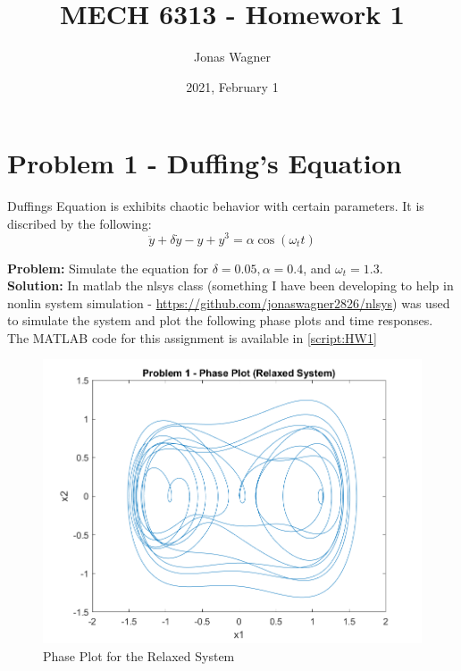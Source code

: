 \documentclass[letter]{article}
\title{MECH 6313 - Homework 1}
\author{Jonas Wagner}
\date{2021, February 1}
\begin{document}
\maketitle


\section{Problem 1 - Duffing's Equation}
Duffings Equation is exhibits chaotic behavior with certain parameters. It is discribed by the following:
\begin{displaymath}
	\ddot{y} + \delta \dot{y} - y + y^3 = \alpha \cos(\omega_t t)
\end{displaymath}

\textbf{Problem:}
Simulate the equation for $\delta = 0.05, \alpha = 0.4$, and $\omega_t = 1.3$.\\

\textbf{Solution:}
In matlab the nlsys class (something I have been developing to help in nonlin system simulation - \href{https://github.com/jonaswagner2826/nlsys}{https://github.com/jonaswagner2826/nlsys}) was used to simulate the system and plot the following phase plots and time responses. The MATLAB code for this assignment is available in \appendixname \ref{script:HW1}\\



\begin{figure}[h]
	\centering
	\includegraphics[width=0.7\linewidth]{fig/pblm1_phase}
	\caption{Phase Plot for the Relaxed System}
	\label{fig:pblm1phase}
\end{figure}
\end{document}
